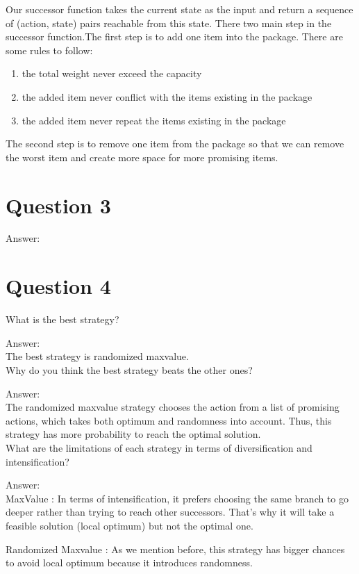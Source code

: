 \documentclass[12pt, a4paper]{report}
\begin{document}
Our successor function takes the current state as the input and  return a sequence of (action, state) pairs reachable from this state. There two main step in the successor function.The first step is to add one item into the package. There are some rules to follow: 
\begin{enumerate}
    \item the total weight never exceed the capacity
    \item the added item never conflict with the items existing in the package
    \item the added item never repeat the items existing in the package
\end{enumerate}

The second step is to remove one item from the package so that we can remove the worst item and create more space for more promising items.


\section{Question 3}
\par Answer:

\section{Question 4}
What is the best strategy?

Answer: \\
The best strategy is randomized maxvalue. \\

Why do you think the best strategy beats the other ones?

Answer: \\
The randomized maxvalue strategy chooses the action from a list of promising actions, which takes both optimum and randomness into account. Thus, this strategy has more probability to reach the optimal solution. \\

What are the limitations of each strategy in terms of diversification and intensification?

Answer: \\
MaxValue : In terms of intensification, it prefers choosing the same branch to go deeper rather than trying to reach other successors. That's why it will take a feasible solution (local optimum) but not the optimal one.

Randomized Maxvalue : As we mention before, this strategy has bigger chances to avoid local optimum because it introduces randomness. \\
\end{document}
